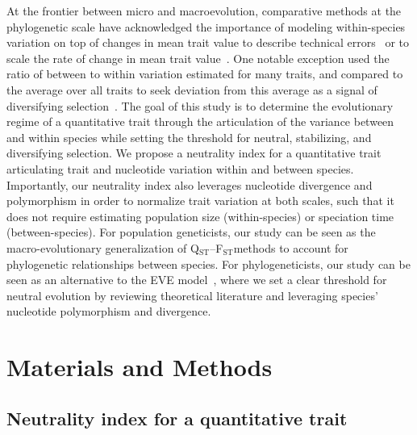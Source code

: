 \documentclass{article}
\newcommand{\QstFst}{Q$_\text{ST}$--F$_\text{ST}$}
\begin{document}
At the frontier between micro and macroevolution, comparative methods at the phylogenetic scale have acknowledged the importance of modeling within-species variation on top of changes in mean trait value to describe technical errors~\parencite{lynch_methods_1991, felsenstein_comparative_2008, hansen_interpreting_2012} or to scale the rate of change in mean trait value~\parencite{kostikova_bridging_2016, gaboriau_multiplatform_2020, gaboriau_exploring_2023}.
One notable exception used the ratio of between to within variation estimated for many traits, and compared to the average over all traits to seek deviation from this average as a signal of diversifying selection~\parencite{rohlfs_modeling_2014, rohlfs_phylogenetic_2015}.
The goal of this study is to determine the evolutionary regime of a quantitative trait through the articulation of the variance between and within species while setting the threshold for neutral, stabilizing, and diversifying selection.
We propose a neutrality index for a quantitative trait articulating trait and nucleotide variation within and between species.
Importantly, our neutrality index also leverages nucleotide divergence and polymorphism in order to normalize trait variation at both scales, such that it does not require estimating population size (within-species) or speciation time (between-species).
For population geneticists, our study can be seen as the macro-evolutionary generalization of \QstFst methods to account for phylogenetic relationships between species.
For phylogeneticists, our study can be seen as an alternative to the EVE model~\parencite{rohlfs_modeling_2014, rohlfs_phylogenetic_2015}, where we set a clear threshold for neutral evolution by reviewing theoretical literature and leveraging species' nucleotide polymorphism and divergence.


\section*{Materials and Methods}\label{sec:materials-and-methods}
\subsection*{Neutrality index for a quantitative trait}\label{subsec:neutrality-index-for-a-quantitative-trait}
\end{document}

